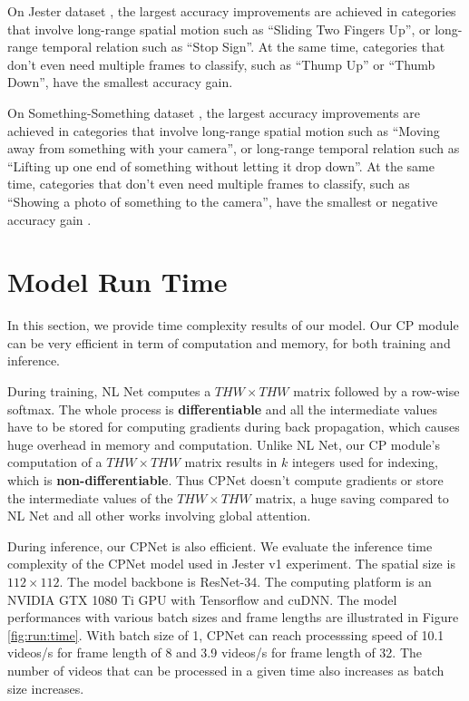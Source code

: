 \documentclass[10pt,twocolumn,letterpaper]{article}
\begin{document}
On Jester dataset \cite{Jester}, the largest accuracy improvements are achieved in categories that involve long-range spatial motion such as ``Sliding Two Fingers Up'', or long-range temporal relation such as ``Stop Sign''. At the same time, categories that don't even need multiple frames to classify, such as ``Thump Up'' or ``Thumb Down'', have the smallest accuracy gain.

On Something-Something dataset \cite{Something:Something}, the largest accuracy improvements are achieved in categories that involve long-range spatial motion such as ``Moving away from something with your camera'', or long-range temporal relation such as ``Lifting up one end of something without letting it drop down''. At the same time, categories that don't even need multiple frames to classify, such as ``Showing a photo of something to the camera'', have the smallest or negative accuracy gain .



\section{Model Run Time}
\label{sec:model:run:time}

In this section, we provide time complexity results of our model.
Our CP module can be very efficient in term of computation and memory, for both training and inference. 

During training, NL Net \cite{NLNet} computes a  $THW\times THW$ matrix followed by a row-wise softmax. The whole process is \textbf{differentiable} and all the intermediate values have to be stored for computing gradients during back propagation, which causes huge overhead in memory and computation. Unlike NL Net, our CP module's computation of a $THW\times THW$ matrix results in $k$ integers used for indexing, which is \textbf{non-differentiable}.  Thus CPNet doesn't compute gradients or store the intermediate values of the $THW\times THW$ matrix, a huge saving compared to NL Net and all  other works involving global attention.

During inference, our CPNet is also efficient. We evaluate the inference time complexity of the CPNet model used in Jester v1 experiment. The spatial size is $112\times112$. The model backbone is ResNet-34. The computing platform is an NVIDIA GTX 1080 Ti GPU with Tensorflow and cuDNN. The model performances with various batch sizes and frame lengths are illustrated in Figure \ref{fig:run:time}. With batch size of 1, CPNet can reach processsing speed of 10.1 videos/s for frame length of 8 and 3.9 videos/s for frame length of 32. The number of videos that can be processed in a given time also increases as batch size increases.   
\end{document}
